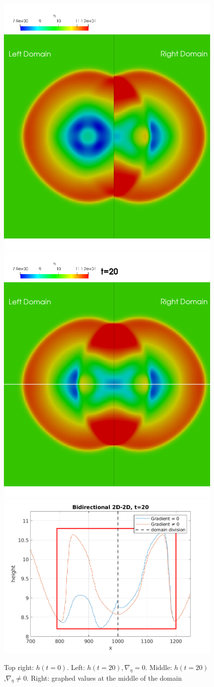 \begin{frame}
\begin{figure}[htp]
\centering
\includegraphics[width=.25\textwidth]{./Resources/Images/bidirectional20_g_0.png}\hfill
\includegraphics[width=.25\textwidth]{./Resources/Images/bidirectional20_g_bueno.png}\hfill
\includegraphics[width=.4\textwidth]{./Resources/Images/bidirectional_graph.png}
\caption{Top right: $h(t=0)$. Left: $h(t=20),\nabla_\eta=0$. Middle: $h(t=20)$,$\nabla_\eta \neq0$. Right: graphed values at the middle of the domain}
\end{figure}

\end{frame}


